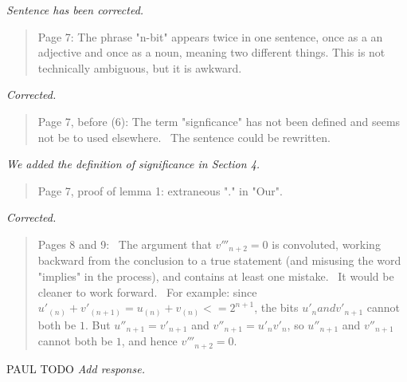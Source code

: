 \documentclass{article}
\theoremstyle{plain} \newtheorem{lemma}{Lemma}
\begin{document}
{\it Sentence has been corrected.}

\begin{quote}
Page 7: The phrase "n-bit" appears twice in one sentence, once as a
an adjective and once as a noun, meaning two different things. This is
not technically ambiguous, but it is awkward.
\end{quote}

{\it Corrected.}

\begin{quote}
Page 7, before (6): The term "signficance" has not been defined and
seems not be to used elsewhere.  The sentence could be rewritten.
\end{quote}

{\it We added the definition of significance in Section 4.}

\begin{quote}
Page 7, proof of lemma 1: extraneous "." in "Our".
\end{quote}

{\it Corrected.}

\begin{quote}
Pages 8 and 9:  The argument that $v'''_{n+2} = 0$ is convoluted, working
backward from the conclusion to a true statement (and misusing the word
"implies" in the process), and contains at least one mistake.  It would be
cleaner to work forward.  For example: since $u'_{(n)} + v'_{(n+1)} =
u_{(n)} + v_{(n)} <= 2^{n+1}$, the bits $u'_n and v'_{n+1}$ cannot both be $1$.
But $u''_{n+1} = v'_{n+1}$ and $v''_{n+1} = u'_n v'_n$, so $u''_{n+1}$ and
$v''_{n+1}$ cannot both be $1$, and hence $v'''_{n+2} = 0$.
\end{quote}

PAUL TODO
{\it Add response.}



\end{document}
